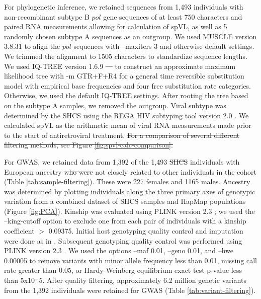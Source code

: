 \documentclass[12pt]{article} %
\providecommand{\DIFadd}[1]{{\protect\color{blue}\uwave{#1}}} %
\providecommand{\DIFdel}[1]{{\protect\color{red}\sout{#1}}}                      %
\providecommand{\DIFaddbegin}{} %
\providecommand{\DIFaddend}{} %
\providecommand{\DIFdelbegin}{} %
\providecommand{\DIFdelend}{} %
\newcommand{\DIFscaledelfig}{0.5}
\newlength{\DIFdelgraphicswidth} %
\newlength{\DIFdelgraphicsheight} %
\newcommand{\DIFaddincludegraphics}[2][]{{\color{blue}\fbox{\DIFOincludegraphics[#1]{#2}}}} %
\newcommand{\DIFdelincludegraphics}[2][]{%
\sbox{\DIFdelgraphicsbox}{\DIFOincludegraphics[#1]{#2}}%
\settoboxwidth{\DIFdelgraphicswidth}{\DIFdelgraphicsbox} %
\settoboxtotalheight{\DIFdelgraphicsheight}{\DIFdelgraphicsbox} %
\scalebox{\DIFscaledelfig}{%
\parbox[b]{\DIFdelgraphicswidth}{\usebox{\DIFdelgraphicsbox}\\[-\baselineskip] \rule{\DIFdelgraphicswidth}{0em}}\llap{\resizebox{\DIFdelgraphicswidth}{\DIFdelgraphicsheight}{%
\setlength{\unitlength}{\DIFdelgraphicswidth}%
\begin{picture}(1,1)%
\thicklines\linethickness{2pt} %
{\color[rgb]{1,0,0}\put(0,0){\framebox(1,1){}}}%
{\color[rgb]{1,0,0}\put(0,0){\line( 1,1){1}}}%
{\color[rgb]{1,0,0}\put(0,1){\line(1,-1){1}}}%
\end{picture}%
}\hspace*{3pt}}} %
} %
\DeclareRobustCommand{\DIFaddbegin}{\DIFOaddbegin \let\includegraphics\DIFaddincludegraphics} %
\DeclareRobustCommand{\DIFaddend}{\DIFOaddend \let\includegraphics\DIFOincludegraphics} %
\DeclareRobustCommand{\DIFdelbegin}{\DIFOdelbegin \let\includegraphics\DIFdelincludegraphics} %
\DeclareRobustCommand{\DIFdelend}{\DIFOaddend \let\includegraphics\DIFOincludegraphics} %
\begin{document}
\begin{doublespace}
For phylogenetic inference, we retained sequences from 1,493 individuals with non-recombinant subtype B $pol$ gene sequences of at least 750 characters and paired RNA measurements allowing for calculation of spVL, as well as 5 randomly chosen subtype A sequences as an outgroup. We used MUSCLE version 3.8.31 \citep{edgar_muscle:_2004} to align the $pol$ sequences with --maxiters 3 and otherwise default settings. We trimmed the alignment to 1505 characters to standardize sequence lengths. We used IQ-TREE version 1.6.9 \DIFdelbegin \DIFdel{\mbox{%
\citep{Nguyen2014} }\hskip0pt%
}\DIFdelend to construct an approximate maximum likelihood tree with -m GTR+F+R4 for a general time reversible substitution model with empirical base frequencies and four free substitution rate categories. Otherwise, we used the default IQ-TREE settings. After rooting the tree based on the subtype A samples, we removed the outgroup. Viral subtype was determined by the SHCS using the REGA HIV subtyping tool version 2.0 \citep{DeOliveira2005}. We calculated spVL as the arithmetic mean of viral RNA measurements made prior to the start of antiretroviral treatment. 
\DIFdelbegin \DIFdel{For a comparison of several different filtering methods, see Figure \ref{fig:spvl-calc-comparison}. 
}\DIFdelend 

For GWAS, we retained data from 1,392 of the 1,493 \DIFdelbegin \DIFdel{SHCS }\DIFdelend individuals with European ancestry \DIFdelbegin \DIFdel{who were }\DIFdelend \DIFaddbegin \DIFadd{and }\DIFaddend not closely related to other individuals in the cohort (Table \ref{tab:sample-filtering}). These were 227 females and 1165 males. Ancestry was determined by plotting individuals along the three primary axes of genotypic variation from a combined dataset of SHCS samples and HapMap populations (Figure \ref{fig:PCA}). Kinship was evaluated using PLINK version 2.3 \citep{Chang2015}; we used the --king-cutoff option to exclude one from each pair of individuals with a kinship coefficient $>$ 0.09375. Initial host genotyping quality control and imputation were done as in \cite{Thorball2021GeneticLymphoma}. Subsequent genotyping quality control was performed using PLINK version 2.3 \citep{Chang2015}. We used the options --maf 0.01, --geno 0.01, and --hwe 0.00005 to remove variants with minor allele frequency less than 0.01, missing call rate greater than 0.05, or Hardy-Weinberg equilibrium exact test p-value less than 5x10$^-5$. After quality filtering, approximately 6.2 million genetic variants from the 1,392 individuals were retained for GWAS (Table \ref{tab:variant-filtering}). 


\end{doublespace}
\end{document}
